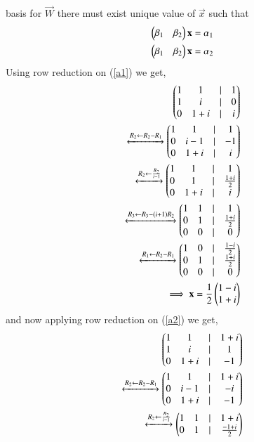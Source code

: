 \documentclass[journal,12pt,twocolumn]{IEEEtran}
\begin{document}
\begin{enumerate}[label=\emph{\alph*)}]
	basis for $\vec{W}$ there must exist unique value of $\vec{x}$ such that
	\begin{align}
		\myvec{\beta_1 & \beta_2}\vec{x}=\alpha_1 \label{a1}\\
		\myvec{\beta_1 & \beta_2}\vec{x}=\alpha_2 \label{a2}
	\end{align}
Using row reduction on (\ref{a1}) we get,
\begin{align}
	\begin{pmatrix}1 & 1 & | & 1 \\
	       1 & i & | & 0 \\
	       0 & 1+i &| & i\end{pmatrix}\\
	\xleftrightarrow[]{R_2 \leftarrow R_2-R_1}
	\begin{pmatrix}1 & 1 & | & 1 \\
               0 & i-1 & | & -1 \\
               0 & 1+i &| & i\end{pmatrix}\\
        \xleftrightarrow[]{R_2 \leftarrow \frac{R_2}{i-1}}
	\begin{pmatrix}1 & 1 & | & 1 \\
	       0 & 1 & | & \frac{1+i}{2} \\
               0 & 1+i &| & i\end{pmatrix}\\
	\xleftrightarrow[]{R_3 \leftarrow R_3 - (i+1)R_2}
	\begin{pmatrix}1 & 1 & | & 1 \\
               0 & 1 & | & \frac{1+i}{2} \\
               0 & 0 &| & 0\end{pmatrix}\\
	\xleftrightarrow[]{R_1 \leftarrow R_2- R_1}
	\begin{pmatrix}1 & 0 & | & \frac{1-i}{2} \\
               0 & 1 & | & \frac{1+i}{2} \\
               0 & 0 &| & 0\end{pmatrix}\\
	\implies 
	\mathbf{x}=\frac{1}{2}\begin{pmatrix}1-i \\ 1+i\end{pmatrix}
\end{align}
and now applying row reduction on (\ref{a2}) we get,
\begin{align}
        \begin{pmatrix}1 & 1 & | & 1+i \\
	       1 & i & | & 1 \\
               0 & 1+i &| & -1\end{pmatrix}\\
        \xleftrightarrow[]{R_2 \leftarrow R_2-R_1}
        \begin{pmatrix}1 & 1 & | & 1+i \\
               0 & i-1 & | & -i \\
               0 & 1+i &| & -1\end{pmatrix}\\
        \xleftrightarrow[]{R_2 \leftarrow \frac{R_2}{i-1}}
        \begin{pmatrix}1 & 1 & | & 1+i \\
               0 & 1 & | & \frac{-1+i}{2} \\
\end{pmatrix}
\end{align}
\end{enumerate}
\end{document}
